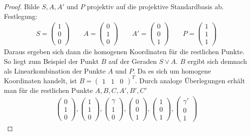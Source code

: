   \begin{proof}
    Bilde $S, A, A'$ und $P$ projektiv auf die projektive Standardbasis ab. Festlegung:
    \begin{align*}
      S  =  \begin{pmatrix} 1 \\ 0 \\ 0 \end{pmatrix} \qquad
      A  =  \begin{pmatrix} 0 \\ 1 \\ 0 \end{pmatrix} \qquad
      A' =  \begin{pmatrix} 0 \\ 0 \\ 1 \end{pmatrix} \qquad
      P  =  \begin{pmatrix} 1 \\ 1 \\ 1 \end{pmatrix}
    \end{align*}
    Daraus ergeben sich dann die homogenen Koordinaten für die restlichen Punkte. So liegt zum Beispiel der Punkt $B$ auf
    der Geraden $S \vee A$. $B$ ergibt sich demnach als Linearkombination der Punkte $A$ und $P$. Da es sich um homogene
    Koordinaten handelt, ist $B=\begin{pmatrix} 1 & 1 & 0 \end{pmatrix}^T$. Durch analoge Überlegungen erhält man für die
    restlichen Punkte $A,B,C,A',B',C'$
    \begin{align*}
      \begin{pmatrix} 0 \\ 1 \\ 0 \end{pmatrix},
      \begin{pmatrix} 1 \\ 1 \\ 0 \end{pmatrix},
      \begin{pmatrix} \gamma  \\ 1 \\ 0 \end{pmatrix},
      \begin{pmatrix} 0 \\ 0 \\ 1 \end{pmatrix},
      \begin{pmatrix} 1 \\ 0 \\ 1 \end{pmatrix},
      \begin{pmatrix} \gamma' \\ 0 \\ 1 \end{pmatrix}
    \end{align*}


\end{proof}
